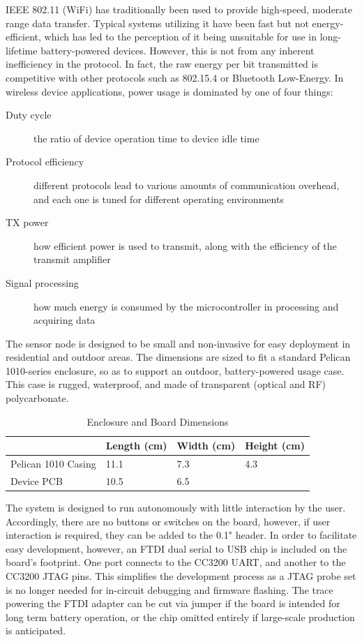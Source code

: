 IEEE 802.11 (WiFi) has traditionally been used to provide high-speed, moderate range data transfer. Typical systems utilizing it have been fast but not energy-efficient, which has led to the perception of it being unsuitable for use in long-lifetime battery-powered devices. However, this is not from any inherent inefficiency in the protocol. In fact, the raw energy per bit transmitted is competitive with other protocols such as 802.15.4 or Bluetooth Low-Energy\cite{DanielDobkin2009}. In wireless device applications, power usage is dominated by one of four things:

\begin{description}
\item[Duty cycle] the ratio of device operation time to device idle time
\item[Protocol efficiency] different protocols lead to various amounts of communication overhead, and each one is tuned for different operating environments
\item[TX power] how efficient power is used to transmit, along with the efficiency of the transmit amplifier
\item[Signal processing] how much energy is consumed by the microcontroller in processing and acquiring data 
\end{description}

The sensor node is designed to be small and non-invasive for easy deployment in residential and outdoor areas. The dimensions are sized to fit a standard Pelican 1010-series enclosure, so as to support an outdoor, battery-powered usage case. This case is rugged, waterproof, and made of transparent (optical and RF) polycarbonate.

\begin{table}[h]
\begin{tabular}{@{}l|lll@{}}
                    & Length (cm) & Width (cm) & Height (cm) \\ \midrule
Pelican 1010 Casing & 11.1        & 7.3        & 4.3         \\
Device PCB          & 10.5        & 6.5        &            
\end{tabular}
\caption{Enclosure and Board Dimensions}
\label{dimensions}
\end{table}

The system is designed to run autonomously with little interaction by the user. Accordingly, there are no buttons or switches on the board, however, if user interaction is required, they can be added to the 0.1" header. In order to facilitate easy development, however, an FTDI dual serial to USB chip is included on the board's footprint. One port connects to the CC3200 UART, and another to the CC3200 JTAG pins. This simplifies the development process as a JTAG probe set is no longer needed for in-circuit debugging and firmware flashing. The trace powering the FTDI adapter can be cut via jumper if the board is intended for long term battery operation, or the chip omitted entirely if large-scale production is anticipated.

